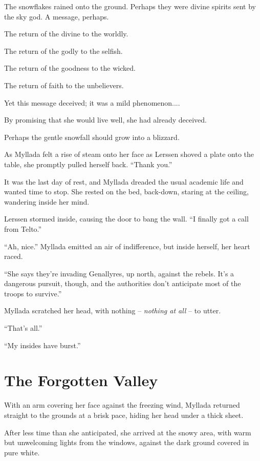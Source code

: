 The snowflakes rained onto the ground. Perhaps they were divine spirits sent by the sky god. A message, perhaps.

The return of the divine to the worldly.

The return of the godly to the selfish.

The return of the goodness to the wicked.

The return of faith to the unbelievers.

Yet this message deceived; it was a mild phenomenon....

By promising that she would live well, she had already deceived.

Perhaps the gentle snowfall should grow into a blizzard.

As Myllada felt a rise of steam onto her face as Lerssen shoved a plate onto the table, she promptly pulled herself back. ``Thank you.''

\centeredstars

It was the last day of rest, and Myllada dreaded the usual academic life and wanted time to stop. She rested on the bed, back-down, staring at the ceiling, wandering inside her mind.

Lerssen stormed inside, causing the door to bang the wall. ``I finally got a call from Telto.''

``Ah, nice.'' Myllada emitted an air of indifference, but inside herself, her heart raced.

``She says they're invading Genallyres, up north, against the rebels. It's a dangerous pursuit, though, and the authorities don't anticipate most of the troops to survive.''

Myllada scratched her head, with nothing -- \emph{nothing at all} -- to utter.

``That's all.''

``My insides have burst.''

\chapter{The Forgotten Valley}

With an arm covering her face against the freezing wind, Myllada returned straight to the grounds at a brisk pace, hiding her head under a thick sheet.

After less time than she anticipated, she arrived at the snowy area, with warm but unwelcoming lights from the windows, against the dark ground covered in pure white.

